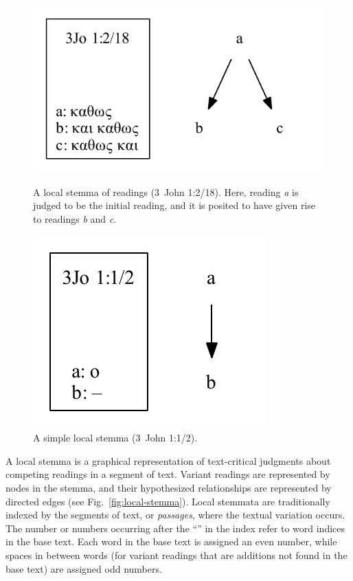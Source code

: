 \documentclass[a4paper, 12pt]{article}
\begin{document}
	\begin{figure}
		\vspace{-\baselineskip}
		\centering
		\includegraphics[scale=0.6666]{../graphics/B25K1V2U18-local-stemma.pdf}
		\caption{A local stemma of readings (3~John 1:2/18). Here, reading \emph{a} is judged to be the initial reading, and it is posited to have given rise to readings \emph{b} and \emph{c}.}
		\label{fig:local-stemma}
		\vspace{\baselineskip}
		\includegraphics[scale=0.6666]{../graphics/B25K1V1U2-local-stemma.pdf}
		\caption{A simple local stemma (3~John 1:1/2).}
		\label{fig:local-stemma-simple}
	\end{figure}
	\noindent
	A local stemma is a graphical representation of text-critical judgments about competing readings in a segment of text. Variant readings are represented by nodes in the stemma, and their hypothesized relationships are represented by directed edges (see Fig.~\ref{fig:local-stemma}). Local stemmata are traditionally indexed by the segments of text, or \emph{passages}, where the textual variation occurs. The number or numbers occurring after the ``\ForwardSlash '' in the index refer to word indices in the base text. Each word in the base text is assigned an even number, while spaces in between words (for variant readings that are additions not found in the base text) are assigned odd numbers. 
	
\end{document}
